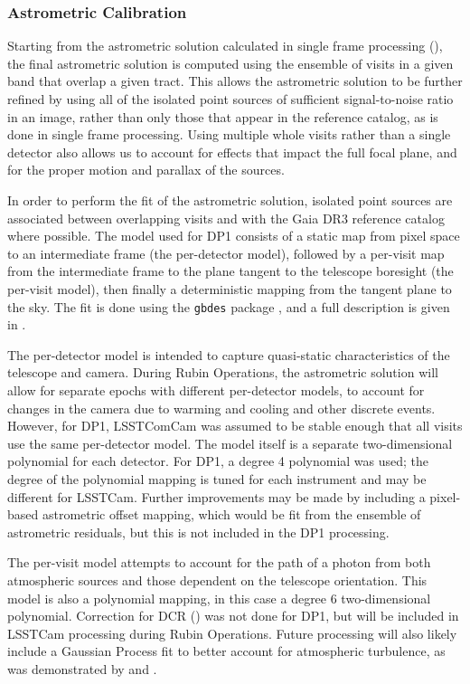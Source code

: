 \subsubsection{Astrometric Calibration}
\label{ssec:global_astrometric_calibration}
Starting from the astrometric solution calculated in single frame processing (), the final astrometric solution is computed using the ensemble of visits in a given band that overlap a given \gls{tract}.
This allows the astrometric solution to be further refined by using all of the isolated point sources of sufficient signal-to-noise ratio in an image, rather than only those that appear in the reference catalog, as is done in single frame processing.
Using multiple whole visits rather than a single detector also allows us to account for effects that impact the full focal plane, and for the proper motion and parallax of the sources.

In order to perform the fit of the astrometric solution, isolated point sources are associated between overlapping visits and with the Gaia \gls{DR3} \citep{2023A&A...674A...1G} reference catalog where possible.
The model used for \gls{DP1} consists of a static map from pixel space to an intermediate frame (the per-detector model), followed by a per-visit map from the intermediate frame to the plane tangent to the telescope boresight (the per-visit model), then finally a deterministic mapping from the tangent plane to the sky.
The fit is done using the \texttt{gbdes} package \citep{Bernstein2017}, and a full description is given in \citet{dmtn-266}.

The per-detector model is intended to capture quasi-static characteristics of the telescope and camera. 
During \gls{Rubin Operations}, the astrometric solution will allow for separate epochs with different per-detector models, to account for changes in the camera due to warming and cooling and other discrete events.
However, for \gls{DP1}, \gls{LSSTComCam} was assumed to be stable enough that all visits use the same per-detector model. The model itself is a separate two-dimensional polynomial for each detector.
For \gls{DP1}, a degree 4 polynomial was used; the degree of the polynomial mapping is tuned for each instrument and may be different for LSSTCam.
Further improvements may be made by including a pixel-based astrometric offset mapping, which would be fit from the ensemble of astrometric residuals, but this is not included in the \gls{DP1} processing.

The per-visit model attempts to account for the path of a photon from both atmospheric sources and those dependent on the telescope orientation.
This model is also a polynomial mapping, in this case a degree 6 two-dimensional polynomial.
Correction for \gls{DCR} () was not done for \gls{DP1}, but will be included in LSSTCam processing during \gls{Rubin Operations}.
Future processing will also likely include a Gaussian Process fit to better account for atmospheric turbulence, as was demonstrated by \citet{Fortino2021} and \citet{Leget2021}.

